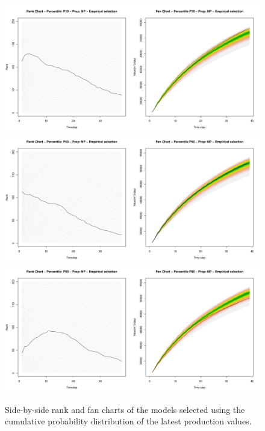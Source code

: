 \documentclass[final,5p,times,twocolumn]{elsarticle}
\begin{document}
\begin{figure}[H]
  \centering
  \includegraphics[width=0.85\columnwidth]{rank-fan-ecdf-p10.pdf}
  \includegraphics[width=0.85\columnwidth]{rank-fan-ecdf-p50.pdf}
  \includegraphics[width=0.85\columnwidth]{rank-fan-ecdf-p90.pdf}
  \caption{Side-by-side rank and fan charts of the models selected using the cumulative probability distribution of the latest production values.}
  \label{fig:rank-fan-ecdf}
\end{figure}
\end{document}
